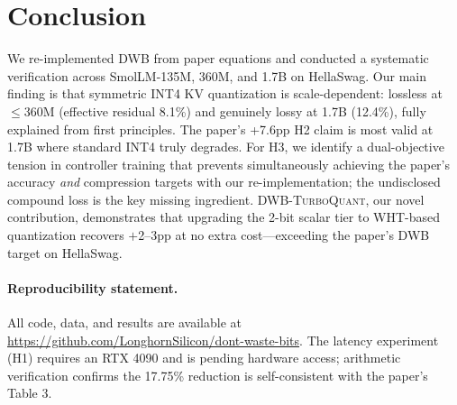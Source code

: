 \documentclass[10pt,twocolumn]{article}
\newcommand{\dwbtq}{\textsc{DWB-TurboQuant}}
\begin{document}
\section{Conclusion}
\label{sec:conclusion}

We re-implemented DWB \cite{haeri2026dwb} from paper equations and
conducted a systematic verification across SmolLM-135M, 360M, and 1.7B
on HellaSwag.
Our main finding is that symmetric INT4 KV quantization is
scale-dependent: lossless at $\leq$360M (effective residual 8.1\%) and
genuinely lossy at 1.7B (12.4\%), fully explained from first principles.
The paper's +7.6pp H2 claim is most valid at 1.7B where standard INT4
truly degrades.
For H3, we identify a dual-objective tension in controller training that
prevents simultaneously achieving the paper's accuracy \emph{and}
compression targets with our re-implementation; the undisclosed compound
loss is the key missing ingredient.
\dwbtq, our novel contribution, demonstrates that upgrading the 2-bit
scalar tier to WHT-based quantization recovers $+$2--3pp at no extra
cost—exceeding the paper's DWB target on HellaSwag.

\paragraph{Reproducibility statement.}
All code, data, and results are available at\\
\url{https://github.com/LonghornSilicon/dont-waste-bits}.
The latency experiment (H1) requires an RTX 4090 and is pending
hardware access; arithmetic verification confirms the 17.75\% reduction
is self-consistent with the paper's Table 3.



\end{document}

